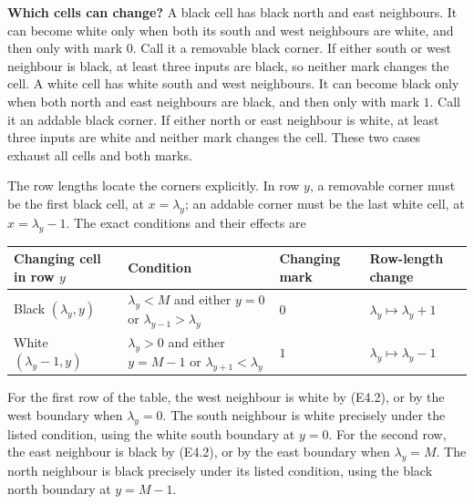 \documentclass[
  11pt,
  a4paper,
]{article}
\begin{document}
\textbf{Which cells can change?} A black cell has black north and east
neighbours. It can become white only when both its south and west
neighbours are white, and then only with mark \(0\). Call it a removable
black corner. If either south or west neighbour is black, at least three
inputs are black, so neither mark changes the cell. A white cell has
white south and west neighbours. It can become black only when both
north and east neighbours are black, and then only with mark \(1\). Call
it an addable black corner. If either north or east neighbour is white,
at least three inputs are white and neither mark changes the cell. These
two cases exhaust all cells and both marks.

The row lengths locate the corners explicitly. In row \(y\), a removable
corner must be the first black cell, at \(x=\lambda_y\); an addable
corner must be the last white cell, at \(x=\lambda_y-1\). The exact
conditions and their effects are

\begin{longtable}[]{@{}
  >{\raggedright\arraybackslash}p{}
  >{\raggedright\arraybackslash}p{}
  >{\raggedright\arraybackslash}p{}
  >{\raggedright\arraybackslash}p{}@{}}
\toprule\noalign{}
\begin{minipage}[b]{\linewidth}\raggedright
Changing cell in row \(y\)
\end{minipage} & \begin{minipage}[b]{\linewidth}\raggedright
Condition
\end{minipage} & \begin{minipage}[b]{\linewidth}\raggedright
Changing mark
\end{minipage} & \begin{minipage}[b]{\linewidth}\raggedright
Row-length change
\end{minipage} \\
\midrule\noalign{}
\endhead
\bottomrule\noalign{}
\endlastfoot
Black \((\lambda_y,y)\) & \(\lambda_y<M\) and either \(y=0\) or
\(\lambda_{y-1}>\lambda_y\) & \(0\) & \(\lambda_y\mapsto\lambda_y+1\) \\
White \((\lambda_y-1,y)\) & \(\lambda_y>0\) and either \(y=M-1\) or
\(\lambda_{y+1}<\lambda_y\) & \(1\) & \(\lambda_y\mapsto\lambda_y-1\) \\
\end{longtable}

For the first row of the table, the west neighbour is white by (E4.2),
or by the west boundary when \(\lambda_y=0\). The south neighbour is
white precisely under the listed condition, using the white south
boundary at \(y=0\). For the second row, the east neighbour is black by
(E4.2), or by the east boundary when \(\lambda_y=M\). The north
neighbour is black precisely under its listed condition, using the black
north boundary at \(y=M-1\).
\end{document}
